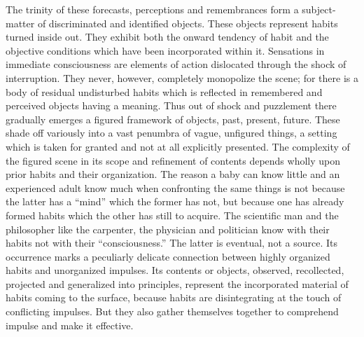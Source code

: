 \documentclass[12pt]{article}
\begin{document}
The trinity of these forecasts, perceptions and remembrances
form a subject-matter of discriminated
and identified objects. These objects represent habits
turned inside out. They exhibit both the onward tendency
of habit and the objective conditions which have
been incorporated within it. Sensations in immediate
consciousness are elements of action dislocated through
the shock of interruption. They never, however, completely
monopolize the scene; for there is a body of
residual undisturbed habits which is reflected in remembered
and perceived objects having a meaning. Thus
out of shock and puzzlement there gradually emerges a
figured framework of objects, past, present, future.
These shade off variously into a vast penumbra of
vague, unfigured things, a setting which is taken for
granted and not at all explicitly presented. The complexity
of the figured scene in its scope and refinement
of contents depends wholly upon prior habits and their
organization. The reason a baby can know little and
an experienced adult know much when confronting the
same things is not because the latter has a ``mind''
which the former has not, but because one has already
formed habits which the other has still to acquire. The
scientific man and the philosopher like the carpenter,
the physician and politician know with their habits not
with their ``consciousness.'' The latter is eventual, not
a source. Its occurrence marks a peculiarly delicate
connection between highly organized habits and unorganized
impulses. Its contents or objects, observed,
recollected, projected and generalized into principles,
represent the incorporated material of habits coming
to the surface, because habits are disintegrating at the
touch of conflicting impulses. But they also gather
themselves together to comprehend impulse and make
it effective.
\end{document}
